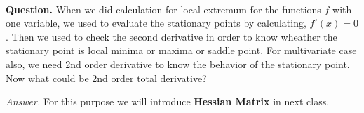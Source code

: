 \documentclass[../Analysis-3.tex]{subfiles}
\begin{document}
\

\textbf{Question.} When we did calculation for local extremum for the functions $f$ with one variable, we used to evaluate the stationary points by calculating, $f'(x) =0$. Then we used to check the second derivative in order to know wheather the stationary point is local minima or maxima or saddle point. For multivariate case also, we need 2nd order derivative to know the behavior of the stationary point. Now what could be 2nd order total derivative?

\ssk

\textit{Answer.} For this purpose we will introduce \textbf{Hessian Matrix} in next class.
\end{document}
